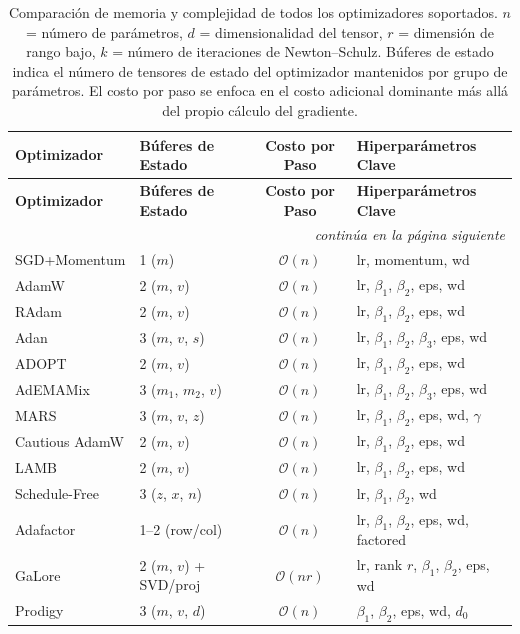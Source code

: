 \begin{longtable}{llcl}
\toprule
\textbf{Optimizador} & \textbf{Búferes de Estado} & \textbf{Costo por Paso} & \textbf{Hiperparámetros Clave} \\
\midrule
\endfirsthead
\toprule
\textbf{Optimizador} & \textbf{Búferes de Estado} & \textbf{Costo por Paso} & \textbf{Hiperparámetros Clave} \\
\midrule
\endhead
\midrule
\multicolumn{4}{r}{\textit{continúa en la página siguiente}} \\
\endfoot
\bottomrule
\caption{Comparación de memoria y complejidad de todos los optimizadores soportados. $n$ = número de parámetros, $d$ = dimensionalidad del tensor, $r$ = dimensión de rango bajo, $k$ = número de iteraciones de Newton--Schulz. Búferes de estado indica el número de tensores de estado del optimizador mantenidos por grupo de parámetros. El costo por paso se enfoca en el costo adicional dominante más allá del propio cálculo del gradiente.}
\label{tab:optimizer-complexity}
\endlastfoot
SGD+Momentum & 1 ($m$) & $\mathcal{O}(n)$ & lr, momentum, wd \\
AdamW & 2 ($m$, $v$) & $\mathcal{O}(n)$ & lr, $\beta_1$, $\beta_2$, eps, wd \\
RAdam & 2 ($m$, $v$) & $\mathcal{O}(n)$ & lr, $\beta_1$, $\beta_2$, eps, wd \\
Adan & 3 ($m$, $v$, $s$) & $\mathcal{O}(n)$ & lr, $\beta_1$, $\beta_2$, $\beta_3$, eps, wd \\
ADOPT & 2 ($m$, $v$) & $\mathcal{O}(n)$ & lr, $\beta_1$, $\beta_2$, eps, wd \\
AdEMAMix & 3 ($m_1$, $m_2$, $v$) & $\mathcal{O}(n)$ & lr, $\beta_1$, $\beta_2$, $\beta_3$, eps, wd \\
MARS & 3 ($m$, $v$, $z$) & $\mathcal{O}(n)$ & lr, $\beta_1$, $\beta_2$, eps, wd, $\gamma$ \\
Cautious AdamW & 2 ($m$, $v$) & $\mathcal{O}(n)$ & lr, $\beta_1$, $\beta_2$, eps, wd \\
LAMB & 2 ($m$, $v$) & $\mathcal{O}(n)$ & lr, $\beta_1$, $\beta_2$, eps, wd \\
Schedule-Free & 3 ($z$, $x$, $n$) & $\mathcal{O}(n)$ & lr, $\beta_1$, $\beta_2$, wd \\
Adafactor & 1--2 (row/col) & $\mathcal{O}(n)$ & lr, $\beta_1$, $\beta_2$, eps, wd, factored \\
GaLore & 2 ($m$, $v$) + SVD/proj & $\mathcal{O}(nr)$ & lr, rank $r$, $\beta_1$, $\beta_2$, eps, wd \\
Prodigy & 3 ($m$, $v$, $d$) & $\mathcal{O}(n)$ & $\beta_1$, $\beta_2$, eps, wd, $d_0$ \\

\end{longtable}
